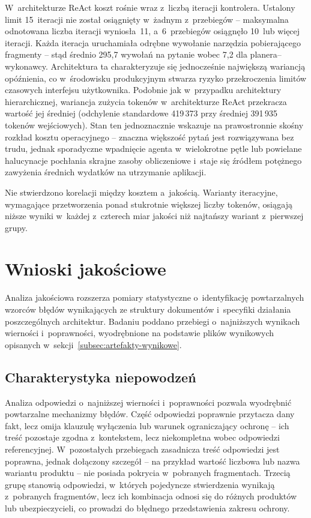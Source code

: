 W~architekturze ReAct koszt rośnie wraz z~liczbą iteracji kontrolera. Ustalony
limit 15~iteracji nie został osiągnięty w~żadnym z~przebiegów -- maksymalna
odnotowana liczba iteracji wyniosła~11, a~6~przebiegów osiągnęło 10~lub więcej
iteracji. Każda iteracja uruchamiała odrębne wywołanie narzędzia pobierającego
fragmenty -- stąd średnio 295{,}7 wywołań na pytanie wobec 7{,}2 dla
planera--wykonawcy. Architektura ta charakteryzuje się jednocześnie największą
wariancją opóźnienia, co w~środowisku produkcyjnym stwarza ryzyko przekroczenia
limitów czasowych interfejsu użytkownika. Podobnie jak w~przypadku architektury
hierarchicznej, wariancja zużycia tokenów w~architekturze ReAct przekracza
wartość jej średniej (odchylenie standardowe 419\,373 przy średniej 391\,935
tokenów wejściowych). Stan ten jednoznacznie wskazuje na prawostronnie skośny
rozkład kosztu operacyjnego -- znaczna większość pytań jest rozwiązywana bez
trudu, jednak sporadyczne wpadnięcie agenta w~wielokrotne pętle lub powielane
halucynacje pochłania skrajne zasoby obliczeniowe i~staje się źródłem potężnego
zawyżenia średnich wydatków na utrzymanie aplikacji.

Nie stwierdzono korelacji między kosztem a~jakością. Warianty iteracyjne,
wymagające przetworzenia ponad stukrotnie większej liczby tokenów, osiągają
niższe wyniki w~każdej z~czterech miar jakości niż najtańszy wariant
z~pierwszej grupy.

\section{Wnioski jakościowe}\label{sec:wnioski-jakosciowe}

Analiza jakościowa rozszerza pomiary statystyczne o~identyfikację powtarzalnych
wzorców błędów wynikających ze struktury dokumentów i~specyfiki działania
poszczególnych architektur. Badaniu poddano przebiegi o~najniższych wynikach
wierności i~poprawności, wyodrębnione na podstawie plików wynikowych opisanych
w~sekcji~\ref{subsec:artefakty-wynikowe}.

\subsection{Charakterystyka niepowodzeń}\label{subsec:charakterystyka-niepowodzen}

Analiza odpowiedzi o~najniższej wierności i~poprawności pozwala wyodrębnić
powtarzalne mechanizmy błędów. Część odpowiedzi poprawnie przytacza dany fakt,
lecz omija klauzulę wyłączenia lub warunek ograniczający ochronę -- ich treść
pozostaje zgodna z~kontekstem, lecz niekompletna wobec odpowiedzi
referencyjnej. W~pozostałych przebiegach zasadnicza treść odpowiedzi jest
poprawna, jednak dołączony szczegół -- na przykład wartość liczbowa lub nazwa
wariantu produktu -- nie posiada pokrycia w~pobranych fragmentach. Trzecią
grupę stanowią odpowiedzi, w~których pojedyncze stwierdzenia wynikają
z~pobranych fragmentów, lecz ich kombinacja odnosi się do różnych produktów lub
ubezpieczycieli, co prowadzi do błędnego przedstawienia zakresu ochrony.

